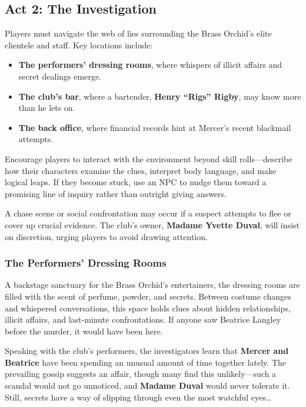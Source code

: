 \subsection{Act 2: The Investigation} 

Players must navigate the web of lies surrounding the Brass Orchid’s elite clientele and staff. Key locations include:
\begin{Example}
	\begin{itemize}
		\item \textbf{The performers’ dressing rooms}, where whispers of illicit affairs and secret dealings emerge.
		\item \textbf{The club’s bar}, where a bartender, \textbf{Henry ``Rigs'' Rigby}, may know more than he lets on.
		\item \textbf{The back office}, where financial records hint at Mercer’s recent blackmail attempts.
	\end{itemize}
\end{Example}

\begin{GmTips}
	Encourage players to interact with the environment beyond skill rolls—describe how their characters examine the clues, interpret body language, and make logical leaps. If they become stuck, use an NPC to nudge them toward a promising line of inquiry rather than outright giving answers.
\end{GmTips}

\noindent
A chase scene or social confrontation may occur if a suspect attempts to flee or cover up crucial evidence. The club’s owner, \textbf{Madame Yvette Duval}, will insist on discretion, urging players to avoid drawing attention.


\subsubsection{The Performers’ Dressing Rooms}
A backstage sanctuary for the Brass Orchid’s entertainers, the dressing rooms are filled with the scent of perfume, powder, and secrets. Between costume changes and whispered conversations, this space holds clues about hidden relationships, illicit affairs, and last-minute confrontations. If anyone saw Beatrice Langley before the murder, it would have been here.

Speaking with the club’s performers, the investigators learn that \textbf{Mercer and Beatrice} have been spending an unusual amount of time together lately. The prevailing gossip suggests an affair, though many find this unlikely—such a scandal would not go unnoticed, and \textbf{Madame Duval} would never tolerate it. Still, secrets have a way of slipping through even the most watchful eyes…


